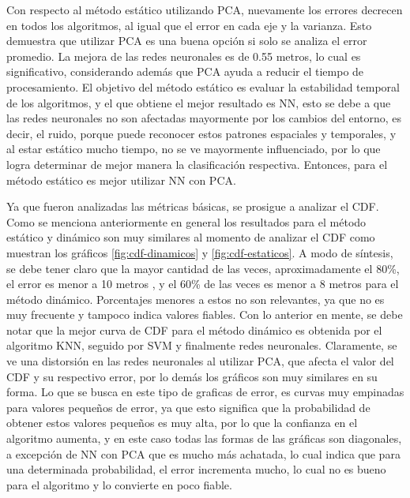 Con respecto al método estático utilizando PCA, nuevamente los errores decrecen en todos los algoritmos, al igual que el error en cada eje y la varianza. Esto demuestra que utilizar PCA es una buena opción si solo se analiza el error promedio. La mejora de las redes neuronales es de 0.55 metros, lo cual es significativo, considerando además que PCA ayuda a reducir el tiempo de procesamiento. El objetivo del método estático es evaluar la estabilidad temporal de los algoritmos, y el que obtiene el mejor resultado es NN, esto se debe a que las redes neuronales no son afectadas mayormente por los cambios del entorno, es decir, el ruido, porque puede reconocer estos patrones espaciales y temporales, y al estar estático mucho tiempo, no se ve mayormente influenciado, por lo que logra determinar de mejor manera la clasificación respectiva. Entonces, para el método estático es mejor utilizar NN con PCA.

Ya que fueron analizadas las métricas básicas, se prosigue a analizar el CDF. Como se menciona anteriormente en general los resultados para el método estático y dinámico son muy similares al momento de analizar el CDF como muestran los gráficos \ref{fig:cdf-dinamicos} y \ref{fig:cdf-estaticos}. A modo de síntesis, se debe tener claro que la mayor cantidad de las veces, aproximadamente el 80\%, el error es menor a 10 metros , y el 60\% de las veces es menor a 8 metros para el método dinámico. Porcentajes menores a estos no son relevantes, ya que no es muy frecuente y tampoco indica valores fiables. Con lo anterior en mente, se debe notar que la mejor curva de CDF para el método dinámico es obtenida por el algoritmo KNN, seguido por SVM y finalmente redes neuronales. Claramente, se ve una distorsión en las redes neuronales al utilizar PCA, que afecta el valor del CDF y su respectivo error, por lo demás los gráficos son muy similares en su forma. Lo que se busca en este tipo de graficas de error, es curvas muy empinadas para valores pequeños de error, ya que esto significa que la probabilidad de obtener estos valores pequeños es muy alta, por lo que la confianza en el algoritmo aumenta, y en este caso todas las formas de las gráficas son diagonales, a excepción de NN con PCA que es mucho más achatada, lo cual indica que para una determinada probabilidad, el error incrementa mucho, lo cual no es bueno para el algoritmo y lo convierte en poco fiable.

